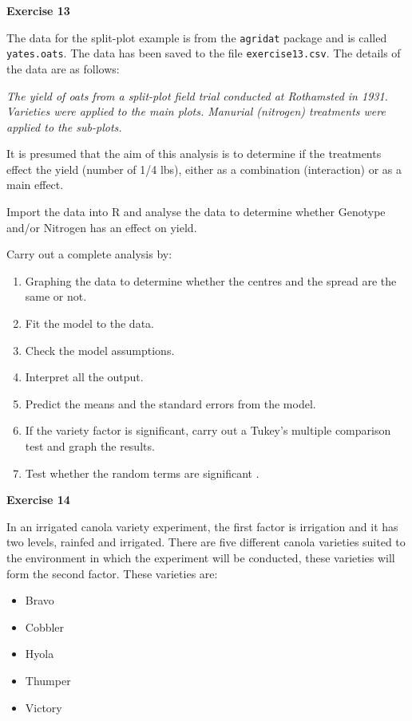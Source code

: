 \documentclass[a4paper, 10pt, fleqn, twosided]{memoir}
\begin{document}
\textbf{Exercise 13}

The data for the split-plot example is from the \texttt{agridat} package \cite{agridat} and is called
\texttt{yates.oats}. The data has been saved to the file \texttt{exercise13.csv}. The details of the data are as
follows:

\textit{The yield of oats from a split-plot field trial conducted at Rothamsted in 1931. Varieties were applied to the
main plots. Manurial (nitrogen) treatments were applied to the sub-plots.}


It is presumed that the aim of this analysis is to determine if the treatments effect the yield (number of 1/4 lbs),
either as a combination (interaction) or as a main effect.

Import the data into R and analyse the data to determine whether Genotype and/or Nitrogen has an effect on yield.


Carry out a complete analysis by:
\begin{enumerate}
  \item Graphing the data to determine whether the centres and the spread are the same or not.
  \item Fit the model to the data.
  \item Check the model assumptions.
  \item Interpret all the output.
  \item Predict the means and the standard errors from the model.
  \item If the variety factor is significant, carry out a Tukey's multiple comparison test and graph the results.
  \item Test whether the random terms are significant .
\end{enumerate}


\textbf{Exercise 14}

In an irrigated canola variety experiment, the first factor is irrigation and it has two levels, rainfed and irrigated.
There are five different canola varieties suited to the environment in which the experiment will be conducted, these
varieties will form the second factor. These varieties are:

\begin{itemize}
\item Bravo
\item Cobbler
\item Hyola
\item Thumper
\item Victory
\end{itemize}
\end{document}
